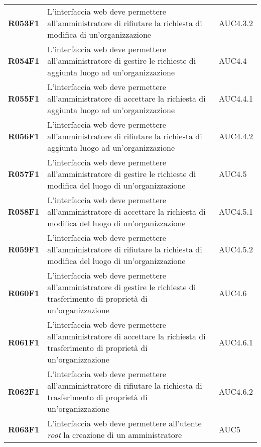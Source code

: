 \documentclass[../analisi-dei-requisiti]{subfiles}
\begin{document}
\begin{longtable}[H]{>{\centering\bfseries}m{3cm} >{\centering}m{10cm} >{\centering\arraybackslash}m{3cm}}
  R053F1                  & L'interfaccia web deve permettere all'amministratore di rifiutare la richiesta di modifica di un'organizzazione                                & AUC4.3.2                      \\
  R054F1                  & L'interfaccia web deve permettere all'amministratore di gestire le richieste di aggiunta luogo ad un'organizzazione                            & AUC4.4                        \\
  R055F1                  & L'interfaccia web deve permettere all'amministratore di accettare la richiesta di aggiunta luogo ad un'organizzazione                          & AUC4.4.1                      \\
  R056F1                  & L'interfaccia web deve permettere all'amministratore di rifiutare la richiesta di aggiunta luogo ad un'organizzazione                          & AUC4.4.2                      \\
  R057F1                  & L'interfaccia web deve permettere all'amministratore di gestire le richieste di modifica del luogo di un'organizzazione                        & AUC4.5                        \\
  R058F1                  & L'interfaccia web deve permettere all'amministratore di accettare la richiesta di modifica del luogo di un'organizzazione                      & AUC4.5.1                      \\
  R059F1                  & L'interfaccia web deve permettere all'amministratore di rifiutare la richiesta di modifica del luogo di un'organizzazione                      & AUC4.5.2                      \\
  R060F1                  & L'interfaccia web deve permettere all'amministratore di gestire le richieste di trasferimento di proprietà di un'organizzazione                & AUC4.6                        \\
  R061F1                  & L'interfaccia web deve permettere all'amministratore di accettare la richiesta di trasferimento di proprietà di un'organizzazione              & AUC4.6.1                      \\
  R062F1                  & L'interfaccia web deve permettere all'amministratore di rifiutare la richiesta di trasferimento di proprietà di un'organizzazione              & AUC4.6.2                      \\
  R063F1                  & L'interfaccia web deve permettere all'utente \textit{root} la creazione di un amministratore                                                   & AUC5                          \\

\end{longtable}
\end{document}
